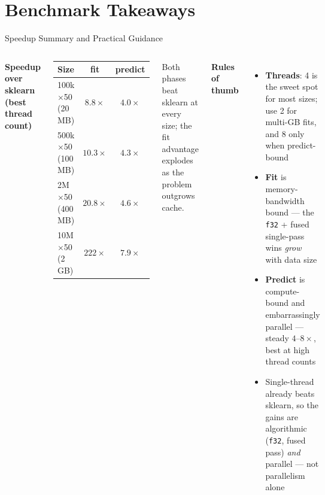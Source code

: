 \documentclass[aspectratio=169]{beamer}
\begin{document}
\section{Benchmark Takeaways}

\begin{frame}{Speedup Summary and Practical Guidance}
  \begin{columns}[T]
    \textbf{Speedup over sklearn (best thread count)}
    \begin{center}\small
    \begin{tabular}{lcc}
      \hline
      Size & fit & predict \\
      \hline
      100k$\times$50 (20 MB)  & $8.8\times$  & $4.0\times$ \\
      500k$\times$50 (100 MB) & $10.3\times$ & $4.3\times$ \\
      2M$\times$50 (400 MB)   & $20.8\times$ & $4.6\times$ \\
      10M$\times$50 (2 GB)    & $222\times$  & $7.9\times$ \\
      \hline
    \end{tabular}
    \end{center}
    \vspace{0.3em}
    Both phases beat sklearn at every size; the fit advantage explodes as the
    problem outgrows cache.

    \textbf{Rules of thumb}
    \begin{itemize}
      \item \textbf{Threads}: 4 is the sweet spot for most sizes; use 2 for
            multi-GB fits, and 8 only when predict-bound
      \item \textbf{Fit} is memory-bandwidth bound — the \texttt{f32} + fused
            single-pass wins \emph{grow} with data size
      \item \textbf{Predict} is compute-bound and embarrassingly parallel —
            steady $4$–$8\times$, best at high thread counts
      \item Single-thread already beats sklearn, so the gains are algorithmic
            (\texttt{f32}, fused pass) \emph{and} parallel — not parallelism alone
    \end{itemize}
  \end{columns}
\end{frame}

\end{document}
